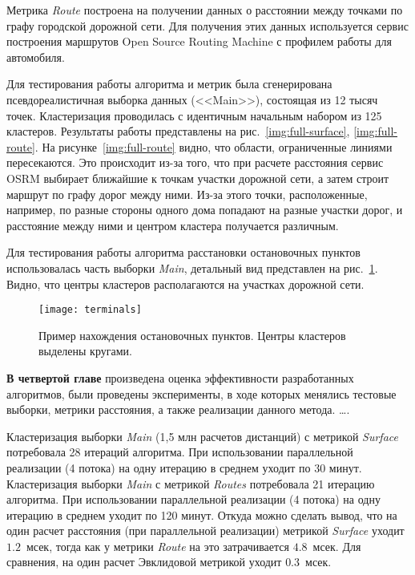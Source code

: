 Метрика \emph{Route} построена на получении данных о расстоянии между точками по графу городской дорожной сети. Для получения этих данных используется сервис построения маршрутов Open Source Routing Machine с профилем работы для автомобиля.

Для тестирования работы алгоритма и метрик была сгенерирована псевдореалистичная выборка данных (<<Main>>), состоящая из 12 тысяч точек. Кластеризация проводилась с идентичным начальным набором из 125 кластеров. Результаты работы представлены на рис.~\ref{img:full-surface}, \ref{img:full-route}. На рисунке~\ref{img:full-route} видно, что области, ограниченные линиями пересекаются. Это происходит из-за того, что при расчете расстояния сервис OSRM выбирает ближайшие к точкам участки дорожной сети, а затем строит маршрут по графу дорог между ними. Из-за этого точки, расположенные, например, по разные стороны одного дома попадают на разные участки дорог, и расстояние между ними и центром кластера получается различным.

Для тестирования работы алгоритма расстановки остановочных пунктов использовалась часть выборки \emph{Main}, детальный вид представлен на рис.~\ref{img:terminals}. Видно, что центры кластеров располагаются на участках дорожной сети.
\begin{figure}[h!]
    \centering
    \texttt{[image: terminals]}\\[1ex]
    \parbox{.9\textwidth}{\caption{Пример нахождения остановочных пунктов. Центры кластеров выделены кругами.} \label{img:terminals}}
\end{figure}

\textbf{В четвертой главе} произведена оценка эффективности разработанных алгоритмов, были проведены эксперименты, в ходе которых менялись тестовые выборки, метрики расстояния, а также реализации данного метода. \ldots.

Кластеризация выборки \emph{Main} (1,5 млн расчетов дистанций) с метрикой \emph{Surface} потребовала 28 итераций алгоритма. При использовании параллельной реализации (4 потока) на одну итерацию в среднем уходит по 30 минут. Кластеризация выборки \emph{Main} с метрикой \emph{Routes} потребовала 21 итерацию алгоритма. При использовании параллельной реализации (4 потока) на одну итерацию в среднем уходит по 120 минут. Откуда можно сделать вывод, что на один расчет расстояния (при параллельной реализации) метрикой \emph{Surface} уходит \( 1.2 \)~мсек, тогда как у метрики \emph{Route} на это затрачивается \( 4.8 \)~мсек. Для сравнения, на один расчет Эвклидовой метрикой уходит \( 0.3 \)~мсек.

